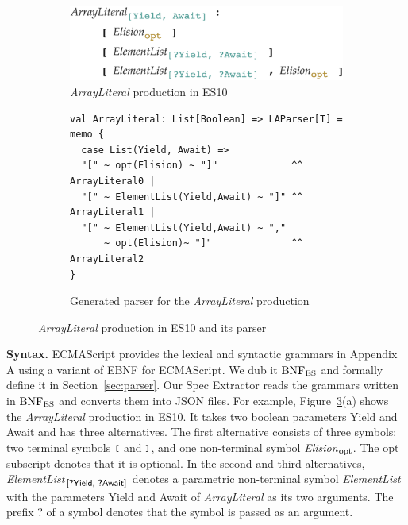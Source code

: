 \begin{figure}
  \centering
  \begin{subfigure}[t]{0.4\textwidth}
    \includegraphics[width=\textwidth]{img/arrayliteral-syntax}
    \caption{\textit{ArrayLiteral} production in ES10}
    \label{fig:array-literal-es}
  \end{subfigure}
  \begin{subfigure}[t]{0.48\textwidth}
    \begin{lstlisting}[style=myScalastyle]
val ArrayLiteral: List[Boolean] => LAParser[T] = memo {
  case List(Yield, Await) =>
  "[" ~ opt(Elision) ~ "]"             ^^ ArrayLiteral0 |
  "[" ~ ElementList(Yield,Await) ~ "]" ^^ ArrayLiteral1 |
  "[" ~ ElementList(Yield,Await) ~ ","
      ~ opt(Elision)~ "]"              ^^ ArrayLiteral2
}
    \end{lstlisting}
    \vspace*{-1em}
    \caption{Generated parser for the \textit{ArrayLiteral} production}
    \label{fig:array-literal-parser}
  \end{subfigure}
  \vspace*{-1em}
  \caption{\textit{ArrayLiteral} production in ES10 and its parser}
  \label{fig:array-literal}
\end{figure}

\smallskip

\textbf{Syntax.} ECMAScript provides the lexical and syntactic grammars in
Appendix A using a variant of EBNF for ECMAScript.  We dub it \( \text{BNF}_{\text{ES}} \) and
formally define it in Section~\ref{sec:parser}.  Our {\sf Spec Extractor} reads
the grammars written in \( \text{BNF}_{\text{ES}} \) and converts them into JSON files.
For example, Figure~\ref{fig:array-literal}(a) shows the \textit{ArrayLiteral}
production in ES10.  It takes two boolean parameters \textsf{Yield} and
\textsf{Await} and has three alternatives.  The first alternative
consists of three symbols: two terminal symbols \( \texttt{\footnotesize[} \) and
\( \texttt{\footnotesize]} \), and one non-terminal symbol \textit{Elision}$_{\mbox{\footnotesize opt}}$.
The {\small opt} subscript denotes that it is optional.  In the second
and third alternatives, \textit{ElementList}$_{\mbox{\footnotesize\sf [?Yield, ?Await]}}$
denotes a parametric non-terminal symbol \textit{ElementList}
with the parameters \textsf{Yield} and \textsf{Await} of
\textit{ArrayLiteral} as its two arguments. The prefix \textsf{\small ?}
of a symbol denotes that the symbol is passed as an argument.

